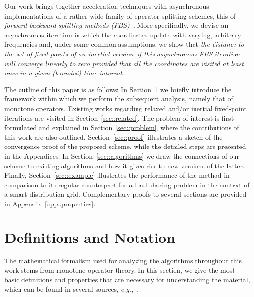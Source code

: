 \documentclass[envcountsect]{svjour3}
\newcommand{\eg}{{\it e.g.}}
\begin{document}
Our work brings together acceleration techniques with asynchronous implementations of a rather wide family of operator splitting schemes, this of \emph{forward-backward splitting methods (FBS)~\cite[Chapter~25]{book_comb}}. More specifically, we devise an asynchronous iteration in which the coordinates update with varying, arbitrary frequencies and, under some common assumptions, we show that \emph{the distance to the set of fixed points of an inertial version of this asynchronous FBS iteration will converge linearly to zero provided that all the coordinates are visited at least once in a given (bounded) time interval}.

The outline of this paper is as follows: In Section~\ref{sec::notation} we briefly introduce the framework within which we perform the subsequent analysis, namely that of monotone operators. Existing works regarding relaxed and/or inertial fixed-point iterations are visited in Section~\ref{sec::related}. The problem of interest is first formulated and explained in Section~\ref{sec::problem}, where the contributions of this work are also outlined. Section~\ref{sec::proof} illustrates a sketch of the convergence proof of the proposed scheme, while the detailed steps are presented in the Appendices. In Section~\ref{sec::algorithms} we draw the connections of our scheme to existing algorithms and how it gives rise to new versions of the latter. Finally, Section~\ref{sec::example} illustrates the performance of the method in comparison to its regular counterpart for a load sharing problem in the context of a smart distribution grid. Complementary proofs to several sections are provided in Appendix~\ref{app::properties}.

\section{Definitions and Notation}\label{sec::notation} %

The mathematical formalism used for analyzing the algorithms throughout this work stems from monotone operator theory. In this section, we give the most basic definitions and properties that are necessary for understanding the material, which can be found in several sources, \eg,~\cite{book_comb,RyuBoydMonotonePrimer}.
\end{document}
